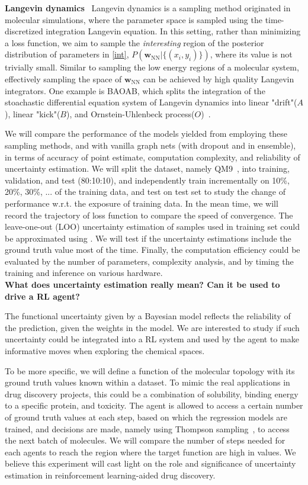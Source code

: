 \documentclass[11pt]{article}
\begin{document}
\textbf{Langevin dynamics}~\cite{leimkuhler2019partitioned} Langevin dynamics is a sampling method originated in molecular simulations, where the parameter space is sampled using the time-discretized integration Langevin equation. In this setting, rather than minimizing a loss function, we aim to sample the \textit{interesting} region of the posterior distribution of parameters in \ref{int}, $P(\mathbf{w}_\text{NN} | \{(x_i, y_i)\})$, where its value is not trivially small. Similar to sampling the low energy regions of a molecular system, effectively sampling the space of $\textbf{w}_\text{NN}$ can be achieved by high quality Langevin integrators. One example is BAOAB, which splits the integration of the stoachastic differential equation system of Langevin dynamics into linear "drift"($A$), linear "kick"($B$), and Ornstein-Uhlenbeck process($O$)~\cite{schobel1999stochastic}.

We will compare the performance of the models yielded from employing these sampling methods, and with vanilla graph nets (with dropout and in ensemble), in terms of accuracy of point estimate, computation complexity, and reliability of uncertainty estimation. We will split the dataset, namely QM9~\cite{ramakrishnan2014quantum}, into training, validation, and test (80:10:10), and independently train incrementally on 10\%, 20\%, 30\%, ... of the training data, and test on test set to study the change of performance w.r.t. the exposure of training data. In the mean time, we will record the trajectory of loss function to compare the speed of convergence. The leave-one-out (LOO) uncertainty estimation of samples used in training set could be approximated using \cite{Vehtari_2016}. We will test if the uncertainty estimations include the ground truth value most of the time. Finally, the computation efficiency could be evaluated by the number of parameters, complexity analysis, and by timing the training and inference on various hardware.\\ 

\noindent\textbf{What does uncertainty estimation really mean? Can it be used to drive a RL agent?}

The functional uncertainty given by a Bayesian model reflects the reliability of the prediction, given the weights in the model. We are interested to study if such uncertainty could be integrated into a RL system and used by the agent to make informative moves when exploring the chemical spaces. 

To be more specific, we will define a function of the molecular topology with its ground truth values known within a dataset. To mimic the real applications in drug discovery projects, this could be a combination of solubility, binding energy to a specific protein, and toxicity. The agent is allowed to access a certain number of ground truth values at each step, based on which the regression models are trained, and decisions are made, namely using Thompson sampling~\cite{slivkins2014contextual}, to access the next batch of molecules. We will compare the number of steps needed for each agents to reach the region where the target function are high in values. We believe this experiment will cast light on the role and significance of uncertainty estimation in reinforcement learning-aided drug discovery.\\
\end{document}
